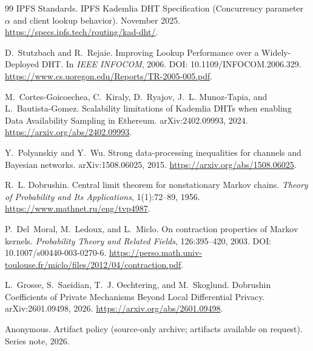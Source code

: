 \documentclass[11pt]{article}
\theoremstyle{definition}
\theoremstyle{remark}
\begin{document}
\begin{thebibliography}{99}
IPFS Standards.
\newblock IPFS Kademlia DHT Specification (Concurrency parameter \(\alpha\) and client lookup behavior).
 November 2025.
\newblock \url{https://specs.ipfs.tech/routing/kad-dht/}.

D.~Stutzbach and R.~Rejaie.
\newblock Improving Lookup Performance over a Widely-Deployed DHT.
\newblock In \emph{IEEE INFOCOM}, 2006.
\newblock DOI: 10.1109/INFOCOM.2006.329.
\newblock \url{https://www.cs.uoregon.edu/Reports/TR-2005-005.pdf}.

M.~Cortes-Goicoechea, C.~Kiraly, D.~Ryajov, J.~L. Munoz-Tapia, and L.~Bautista-Gomez.
\newblock Scalability limitations of Kademlia DHTs when enabling Data Availability Sampling in Ethereum.
\newblock arXiv:2402.09993, 2024.
\newblock \url{https://arxiv.org/abs/2402.09993}.

Y.~Polyanskiy and Y.~Wu.
\newblock Strong data-processing inequalities for channels and Bayesian networks.
\newblock arXiv:1508.06025, 2015.
\newblock \url{https://arxiv.org/abs/1508.06025}.

R.~L. Dobrushin.
\newblock Central limit theorem for nonstationary Markov chains.
\newblock \emph{Theory of Probability and Its Applications}, 1(1):72--89, 1956.
\newblock \url{https://www.mathnet.ru/eng/tvp4987}.

P.~Del~Moral, M.~Ledoux, and L.~Miclo.
\newblock On contraction properties of Markov kernels.
\newblock \emph{Probability Theory and Related Fields}, 126:395--420, 2003.
\newblock DOI: 10.1007/s00440-003-0270-6. \url{https://perso.math.univ-toulouse.fr/miclo/files/2012/04/contraction.pdf}.

L.~Grosse, S.~Saeidian, T.~J. Oechtering, and M.~Skoglund.
\newblock Dobrushin Coefficients of Private Mechanisms Beyond Local Differential Privacy.
\newblock arXiv:2601.09498, 2026.
\newblock \url{https://arxiv.org/abs/2601.09498}.


Anonymous.
\newblock Artifact policy (source-only archive; artifacts available on request).
\newblock Series note, 2026.
\end{thebibliography}
\end{document}
